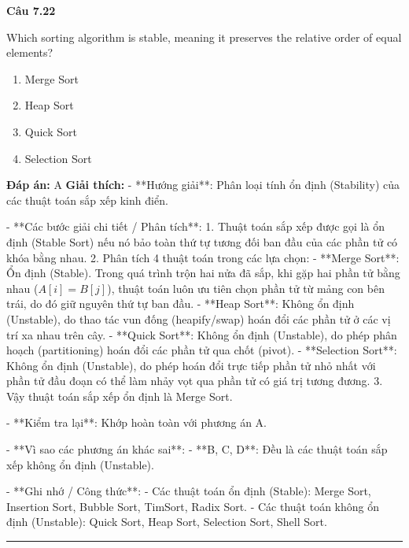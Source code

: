 \documentclass[11pt,a4paper]{article}
\newenvironment{question}[1]{%
  \par\vspace{1em}\noindent\textbf{\large Câu #1}\par\vspace{0.4em}
}{%
  \par\vspace{1em}\hrule\vspace{0.6em}
}
\newenvironment{choices}{%
  \begin{enumerate}[label=\textbf{\Alph*.},leftmargin=2.2em,itemsep=2pt,topsep=3pt]
}{%
  \end{enumerate}
}
\newcommand{\choice}{\item}
\begin{document}
\begin{question}{7.22}
Which sorting algorithm is stable, meaning it preserves the relative order of equal elements?
\begin{choices}
\choice Merge Sort
\choice Heap Sort
\choice Quick Sort
\choice Selection Sort
\end{choices}
\textbf{Đáp án:} A
\textbf{Giải thích:} - **Hướng giải**:
  Phân loại tính ổn định (Stability) của các thuật toán sắp xếp kinh điển.

- **Các bước giải chi tiết / Phân tích**:
  1. Thuật toán sắp xếp được gọi là ổn định (Stable Sort) nếu nó bảo toàn thứ tự tương đối ban đầu của các phần tử có khóa bằng nhau.
  2. Phân tích 4 thuật toán trong các lựa chọn:
     - **Merge Sort**: Ổn định (Stable). Trong quá trình trộn hai nửa đã sắp, khi gặp hai phần tử bằng nhau (\(A[i] = B[j]\)), thuật toán luôn ưu tiên chọn phần tử từ mảng con bên trái, do đó giữ nguyên thứ tự ban đầu.
     - **Heap Sort**: Không ổn định (Unstable), do thao tác vun đống (heapify/swap) hoán đổi các phần tử ở các vị trí xa nhau trên cây.
     - **Quick Sort**: Không ổn định (Unstable), do phép phân hoạch (partitioning) hoán đổi các phần tử qua chốt (pivot).
     - **Selection Sort**: Không ổn định (Unstable), do phép hoán đổi trực tiếp phần tử nhỏ nhất với phần tử đầu đoạn có thể làm nhảy vọt qua phần tử có giá trị tương đương.
  3. Vậy thuật toán sắp xếp ổn định là Merge Sort.

- **Kiểm tra lại**:
  Khớp hoàn toàn với phương án A.

- **Vì sao các phương án khác sai**:
  - **B, C, D**: Đều là các thuật toán sắp xếp không ổn định (Unstable).

- **Ghi nhớ / Công thức**:
  - Các thuật toán ổn định (Stable): Merge Sort, Insertion Sort, Bubble Sort, TimSort, Radix Sort.
  - Các thuật toán không ổn định (Unstable): Quick Sort, Heap Sort, Selection Sort, Shell Sort.
\end{question}
\end{document}
